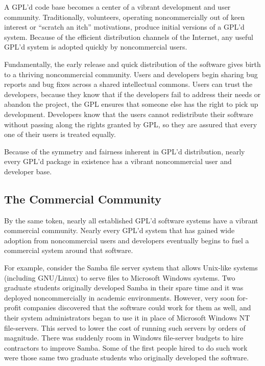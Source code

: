 A GPL'd code base becomes a center of a vibrant development and user
community.  Traditionally, volunteers, operating noncommercially out of
keen interest or ``scratch an itch'' motivations, produce initial versions
of a GPL'd system.  Because of the efficient distribution channels of the
Internet, any useful GPL'd system is adopted quickly by noncommercial
users.

Fundamentally, the early release and quick distribution of the software
gives birth to a thriving noncommercial community.  Users and developers
begin sharing bug reports and bug fixes across a shared intellectual
commons.  Users can trust the developers, because they know that if the
developers fail to address their needs or abandon the project, the GPL
ensures that someone else has the right to pick up development.
Developers know that the users cannot redistribute their software without
passing along the rights granted by GPL, so they are assured that every
one of their users is treated equally.

Because of the symmetry and fairness inherent in GPL'd distribution,
nearly every GPL'd package in existence has a vibrant noncommercial user
and developer base.

\subsection{The Commercial Community}

By the same token, nearly all established GPL'd software systems have a
vibrant commercial community. Nearly every GPL'd system that has gained
wide adoption from noncommercial users and developers eventually begins
to fuel a commercial system around that software.

For example, consider the Samba file server system that allows Unix-like
systems (including GNU/Linux) to serve files to Microsoft Windows systems.
Two graduate students originally developed Samba in their spare time and
it was deployed noncommercially in academic environments. However, very
soon for-profit companies discovered that the software could work for them
as well, and their system administrators began to use it in place of
Microsoft Windows NT file-servers. This served to lower the cost of
running such servers by orders of magnitude. There was suddenly room in
Windows file-server budgets to hire contractors to improve Samba. Some of
the first people hired to do such work were those same two graduate
students who originally developed the software.

